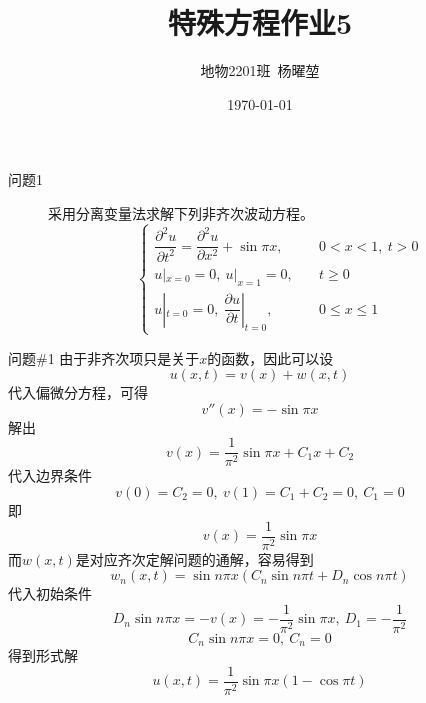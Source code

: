 \documentclass[12pt]{ctexart}
\title{特殊方程作业5}
\author{地物2201班\ 杨曜堃}
\date{\today}
\begin{document}
    \markboth{\theauthor}{\thetitle}
    \maketitle
    \begin{description}
        \item[问题1] 采用分离变量法求解下列非齐次波动方程。
        $$
        \begin{cases}
            \dfrac{\partial^2 u}{\partial t^2}=\dfrac{\partial^2 u}{\partial x^2}+\sin\pi x,&\quad 0<x<1,\ t>0\\
            u|_{x=0}=0,\ u|_{x=1}=0,&\quad t\geqslant 0\\
            u|_{t=0}=0,\ \dfrac{\partial u}{\partial t}|_{t=0},&\quad 0\leqslant x\leqslant 1
        \end{cases}
        $$
    \end{description}
    
    \begin{problem}{问题\#1}
        由于非齐次项只是关于$x$的函数，因此可以设
        $$
        u(x,t)=v(x)+w(x,t)
        $$
        代入偏微分方程，可得
        $$
        v''(x)=-\sin\pi x
        $$
        解出
        $$
        v(x)=\dfrac{1}{\pi^2}\sin\pi x+C_1x+C_2
        $$
        代入边界条件
        $$
        v(0)=C_2=0,\ v(1)=C_1+C_2=0,\ C_1=0
        $$
        即
        $$
        v(x)=\dfrac{1}{\pi^2}\sin\pi x
        $$
        而$w(x,t)$是对应齐次定解问题的通解，容易得到
        $$
        w_n(x,t)=\sin n\pi x(C_n\sin n\pi t+D_n\cos n\pi t)
        $$
        代入初始条件
        $$
        D_n\sin n\pi x=-v(x)=-\dfrac{1}{\pi^2}\sin\pi x,\ D_1=-\dfrac{1}{\pi^2}
        $$
        $$
        C_n\sin n\pi x=0,\ C_n=0
        $$
        得到形式解
        $$
        u(x,t)=\dfrac{1}{\pi^2}\sin\pi x(1-\cos\pi t)
        $$
    \end{problem}
\end{document}

